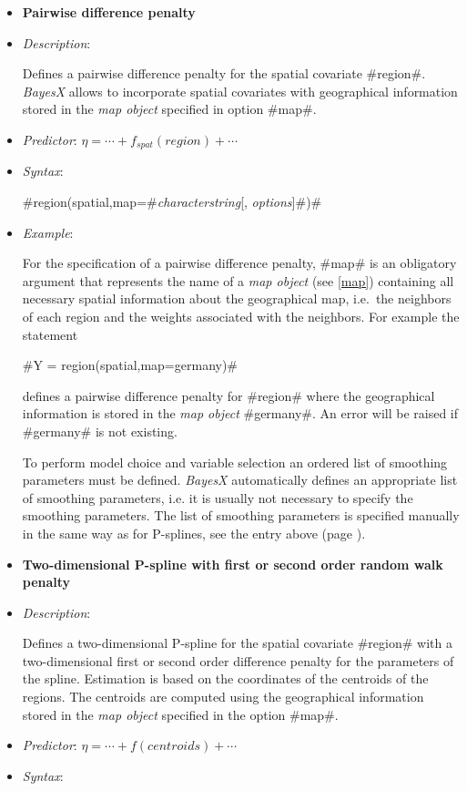 \begin{itemize}
\item[]{\bf\sffamily Pairwise difference penalty}

\item[] {\em Description}:

Defines a pairwise difference penalty for the spatial covariate #region#. {\em BayesX} allows to incorporate spatial
covariates with geographical information stored in the {\em map object} specified in option #map#.
\item[] {\em Predictor}: $\eta = \cdots
+ f_{spat}(region) + \cdots$ \item[] {\em Syntax}:

#region(spatial,map=#{\em characterstring}[, {\em options}]#)#
\item[] {\em Example}:

For the specification of a pairwise difference penalty, #map# is an
obligatory argument that represents the name of a {\em map object}
(see \autoref{map}) containing all necessary spatial information
about the geographical map, i.e.~the neighbors of each region and
the weights associated with the neighbors. For example the
statement

#Y = region(spatial,map=germany)#

defines a pairwise difference penalty for #region# where the
geographical information is stored in the {\em map object}
#germany#. An error will be raised if #germany# is not existing.

To perform model choice and variable selection an ordered list of smoothing parameters must be defined. {\em BayesX} automatically defines an appropriate list of smoothing
parameters, i.e. it is usually not necessary to  specify the smoothing parameters. The list of smoothing parameters is
specified manually in the same way as for P-splines, see the entry above (page \pageref{psplines_stepwise}).


\item[]{\bf\sffamily Two-dimensional P-spline with first or second order
random walk penalty}

\item[] {\em Description}:

Defines a two-dimensional P-spline for the spatial covariate
#region# with a two-dimensional first or second order difference penalty
for the parameters of the spline. Estimation is based on the
coordinates of the centroids of the regions. The centroids are
computed using the geographical information stored in the {\em map
object} specified in the option #map#.
\item[] {\em Predictor}:
$\eta= \cdots + f(centroids) + \cdots$ \item[] {\em Syntax}:


\end{itemize}
